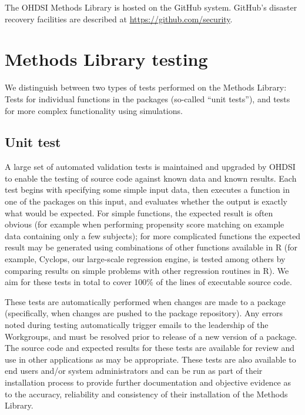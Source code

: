 \documentclass[11pt]{book}
\theoremstyle{definition}
\theoremstyle{definition}
\theoremstyle{definition}
\theoremstyle{remark}
\begin{document}
The OHDSI Methods Library is hosted on the GitHub system. GitHub's disaster recovery facilities are described at \url{https://github.com/security}.

\hypertarget{methods-library-testing}{%
\section{Methods Library testing}\label{methods-library-testing}}

We distinguish between two types of tests performed on the Methods Library: Tests for individual functions in the packages (so-called ``unit tests''), and tests for more complex functionality using simulations.

\hypertarget{unit-test}{%
\subsection{Unit test}\label{unit-test}}

A large set of automated validation tests is maintained and upgraded by OHDSI to enable the testing of source code against known data and known results. Each test begins with specifying some simple input data, then executes a function in one of the packages on this input, and evaluates whether the output is exactly what would be expected. For simple functions, the expected result is often obvious (for example when performing propensity score matching on example data containing only a few subjects); for more complicated functions the expected result may be generated using combinations of other functions available in R (for example, Cyclops, our large-scale regression engine, is tested among others by comparing results on simple problems with other regression routines in R). We aim for these tests in total to cover 100\% of the lines of executable source code.

These tests are automatically performed when changes are made to a package (specifically, when changes are pushed to the package repository). Any errors noted during testing automatically trigger emails to the leadership of the Workgroups, and must be resolved prior to release of a new version of a package. The source code and expected results for these tests are available for review and use in other applications as may be appropriate. These tests are also available to end users and/or system administrators and can be run as part of their installation process to provide further documentation and objective evidence as to the accuracy, reliability and consistency of their installation of the Methods Library.
\end{document}
